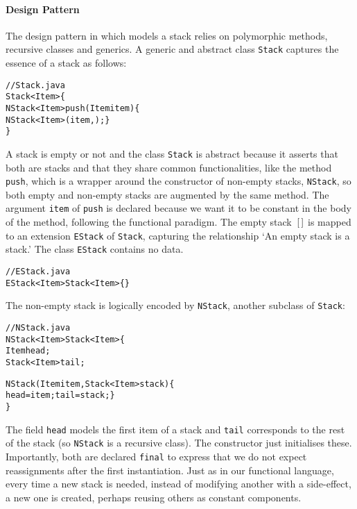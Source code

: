 \paragraph{Design Pattern}

The design pattern in \Java which models a stack  relies on polymorphic methods, recursive classes and
generics. A generic and abstract class \texttt{Stack} captures the
essence of a stack as follows:
\begin{alltt}
// Stack.java
\public \abstractX \class Stack<Item> \{
  \public \final NStack<Item> push(\final Item item) \{
    \return \new NStack<Item>(item,\this); \}
\}
\end{alltt}
A stack is empty or not and the class \texttt{Stack} is abstract
because it asserts that both are stacks and that they share common
functionalities, like the method \texttt{push}, which is a wrapper
around the constructor of non\hyp{}empty stacks, \texttt{NStack}, so
both empty and non\hyp{}empty stacks are augmented by the same
method. The argument \texttt{item} of \texttt{push} is declared
\final{} because we want it to be constant in the body of the method,
following the functional paradigm. The empty stack~\([\,]\) is mapped
to an extension \texttt{EStack} of \texttt{Stack}, capturing the
relationship `An empty stack is a stack.' The class \texttt{EStack}
contains no data.
\begin{alltt}
// EStack.java
\public \final \class EStack<Item> \extends Stack<Item> \{\}
\end{alltt}
The non\hyp{}empty stack is logically encoded by \texttt{NStack},
another subclass of \texttt{Stack}:
\begin{alltt}
// NStack.java
\public \final \class NStack<Item> \extends Stack<Item> \{
  \private \final Item head;
  \private \final Stack<Item> tail;

  \public NStack(\final Item item, \final Stack<Item> stack) \{
    head = item; tail = stack; \}
\}
\end{alltt}
The field \texttt{head} models the first item of a stack and
\texttt{tail} corresponds to the rest of the stack (so \texttt{NStack}
is a recursive class). The constructor just initialises
these. Importantly, both are declared \texttt{final} to express that
we do not expect reassignments after the first instantiation. Just as
in our functional language, every time a new stack is needed, instead
of modifying another with a side\hyp{}effect, a new one is created,
perhaps reusing others as constant components.

